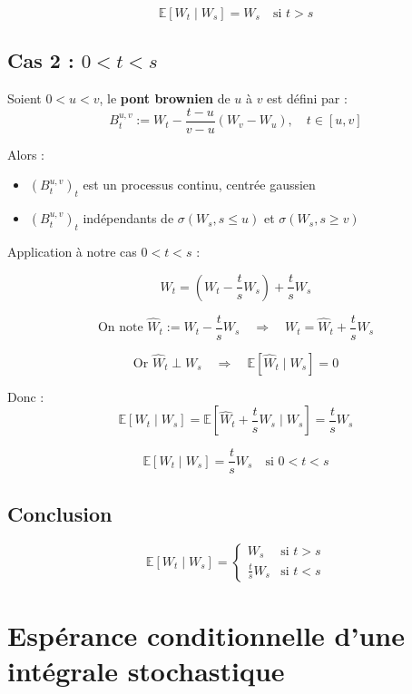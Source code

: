 \[
\boxed{
\mathbb{E}[W_t \mid W_s] = W_s \quad \text{si } t > s
}
\]


\subsection*{Cas 2 : \( 0 < t < s \)}

\begin{rappelBox}
Soient \( 0 < u < v \), le \textbf{pont brownien} de \( u \) à \( v \) est défini par :
\[
B_t^{u,v} := W_t - \frac{t - u}{v - u}(W_v - W_u), \quad t \in [u, v]
\]

Alors :
\begin{itemize}
  \item \( (B_t^{u,v})_t \) est un processus continu, centrée gaussien
  \item $(B_t^{u,v})_t$ indépendants de $\sigma(W_s , s \leq u)$ et $\sigma(W_s , s \geq v)$ 
\end{itemize}
\end{rappelBox}

Application à notre cas \( 0 < t < s \) :

\[
W_t = \left(W_t - \frac{t}{s}W_s\right) + \frac{t}{s}W_s
\]

\[
\text{On note } \widehat{W}_t := W_t - \frac{t}{s} W_s \quad \Rightarrow \quad
W_t = \widehat{W}_t + \frac{t}{s} W_s
\]

\[
\text{Or } \widehat{W}_t \perp W_s \quad \Rightarrow \quad \mathbb{E}[\widehat{W}_t \mid W_s] = 0
\]

Donc :
\[
\mathbb{E}[W_t \mid W_s] = \mathbb{E}\left[\widehat{W}_t + \frac{t}{s} W_s \mid W_s \right]
= \frac{t}{s} W_s
\]

\[
\boxed{
\mathbb{E}[W_t \mid W_s] = \frac{t}{s} W_s \quad \text{si } 0 < t < s
}
\]




\subsection*{Conclusion}

\[
\boxed{
\mathbb{E}[W_t \mid W_s] =
\begin{cases}
W_s & \text{si } t > s \\
\frac{t}{s} W_s & \text{si } t < s
\end{cases}
}
\]



\section{Espérance conditionnelle d'une intégrale stochastique}

